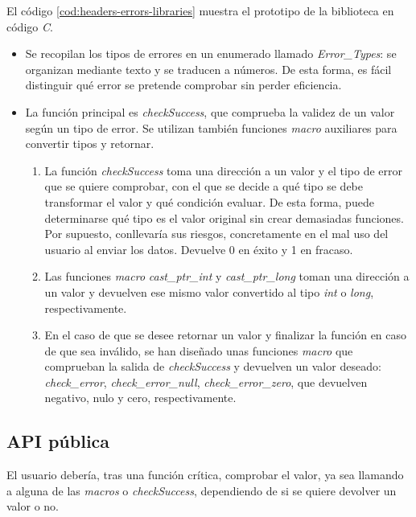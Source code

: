 El código \ref{cod:headers-errors-libraries} muestra el prototipo de la biblioteca en código \textit{C}.

\begin{itemize}

    \item Se recopilan los tipos de errores en un enumerado llamado \textit{Error\_Types}: se organizan mediante texto y se traducen a números. De esta forma, es fácil distinguir qué error se pretende comprobar sin perder eficiencia.

    \item La función principal es \textit{checkSuccess}, que comprueba la validez de un valor según un tipo de error. Se utilizan también funciones \textit{macro} auxiliares para convertir tipos y retornar.
    \begin{enumerate}
    
        \item La función \textit{checkSuccess} toma una dirección a un valor y el tipo de error que se quiere comprobar, con el que se decide a qué tipo se debe transformar el valor y qué condición evaluar. De esta forma, puede determinarse qué tipo es el valor original sin crear demasiadas funciones. Por supuesto, conllevaría sus riesgos, concretamente en el mal uso del usuario al enviar los datos. Devuelve 0 en éxito y 1 en fracaso.

        \item Las funciones \textit{macro} \textit{cast\_ptr\_int} y \textit{cast\_ptr\_long} toman una dirección a un valor y devuelven ese mismo valor convertido al tipo \textit{int} o \textit{long}, respectivamente.

        \item En el caso de que se desee retornar un valor y finalizar la función en caso de que sea inválido, se han diseñado unas funciones \textit{macro} que comprueban la salida de \textit{checkSuccess} y devuelven un valor deseado: \textit{check\_error}, \textit{check\_error\_null}, \textit{check\_error\_zero}, que devuelven negativo, nulo y cero, respectivamente.
        
    \end{enumerate}

\end{itemize}

\subsection{API pública}
El usuario debería, tras una función crítica, comprobar el valor, ya sea llamando a alguna de las \textit{macros} o \textit{checkSuccess}, dependiendo de si se quiere devolver un valor o no.

